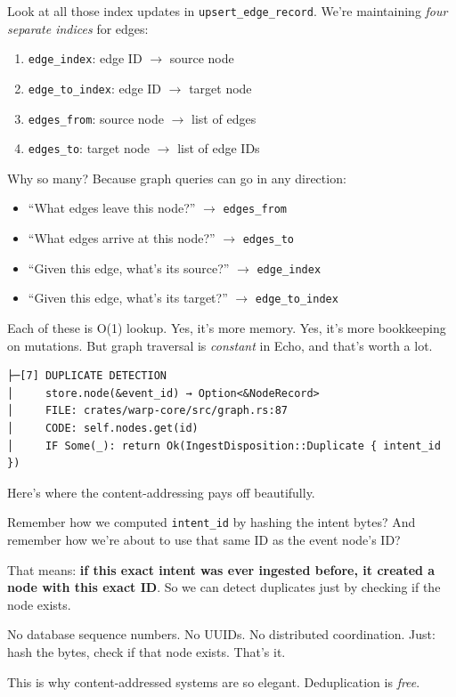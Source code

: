 \documentclass[11pt]{book}
\newenvironment{directors}
{\begin{mdframed}[
  linecolor=blue!60,
  linewidth=2pt,
  leftline=true,
  rightline=false,
  topline=false,
  bottomline=false,
  backgroundcolor=blue!3,
  innerleftmargin=12pt,
  innerrightmargin=10pt,
  innertopmargin=8pt,
  innerbottommargin=8pt,
  skipabove=12pt,
  skipbelow=12pt
]\small\sffamily\color{blue!70!black}}
{\end{mdframed}}
\begin{document}
\begin{directors}
Look at all those index updates in \texttt{upsert\_edge\_record}. We're maintaining \emph{four separate indices} for edges:

\begin{enumerate}
\item \texttt{edge\_index}: edge ID $\rightarrow$ source node
\item \texttt{edge\_to\_index}: edge ID $\rightarrow$ target node
\item \texttt{edges\_from}: source node $\rightarrow$ list of edges
\item \texttt{edges\_to}: target node $\rightarrow$ list of edge IDs
\end{enumerate}

Why so many? Because graph queries can go in any direction:
\begin{itemize}
\item ``What edges leave this node?'' $\rightarrow$ \texttt{edges\_from}
\item ``What edges arrive at this node?'' $\rightarrow$ \texttt{edges\_to}
\item ``Given this edge, what's its source?'' $\rightarrow$ \texttt{edge\_index}
\item ``Given this edge, what's its target?'' $\rightarrow$ \texttt{edge\_to\_index}
\end{itemize}

Each of these is O(1) lookup. Yes, it's more memory. Yes, it's more bookkeeping on mutations. But graph traversal is \emph{constant} in Echo, and that's worth a lot.
\end{directors}

\begin{verbatim}
├─[7] DUPLICATE DETECTION
│     store.node(&event_id) → Option<&NodeRecord>
│     FILE: crates/warp-core/src/graph.rs:87
│     CODE: self.nodes.get(id)
│     IF Some(_): return Ok(IngestDisposition::Duplicate { intent_id })
\end{verbatim}

\begin{directors}
Here's where the content-addressing pays off beautifully.

Remember how we computed \texttt{intent\_id} by hashing the intent bytes? And remember how we're about to use that same ID as the event node's ID?

That means: \textbf{if this exact intent was ever ingested before, it created a node with this exact ID}. So we can detect duplicates just by checking if the node exists.

No database sequence numbers. No UUIDs. No distributed coordination. Just: hash the bytes, check if that node exists. That's it.

This is why content-addressed systems are so elegant. Deduplication is \emph{free}.
\end{directors}
\end{document}
